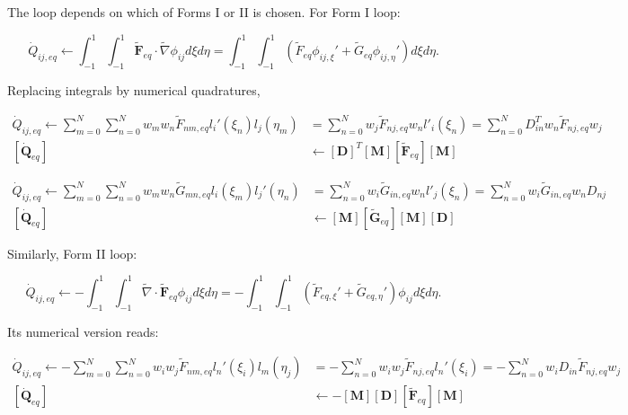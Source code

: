 \documentclass[10pt,a4paper]{article}
\begin{document}
The loop depends on which of Forms I or II is chosen. For Form I loop:

\begin{equation}
\dot{Q}_{ij,eq} \leftarrow \int_{-1}^1 \int_{-1}^1 \boldsymbol{\tilde{F}}_{eq}\cdot \tilde{\nabla} \phi_{ij} d\xi d\eta = \int_{-1}^1 \int_{-1}^1 (\tilde{F}_{eq}\phi_{ij,\xi}' + \tilde{G}_{eq}\phi_{ij,\eta}' )d\xi d\eta.
\end{equation}

Replacing integrals by numerical quadratures,

\begin{equation}
\begin{split}
\dot{Q}_{ij,eq} \leftarrow \sum_{m=0}^N \sum_{n=0}^N	 w_m w_n \tilde{F}_{nm,eq}l_i'(\xi_n)l_j(\eta_m) &= \sum_{n=0}^N w_j \tilde{F}_{nj,eq} w_n l'_i(\xi_n) =  \sum_{n=0}^N  D_{in}^T w_n\tilde{F}_{nj,eq} w_j \\
[\dot{\boldsymbol{Q}}_{eq}] &\leftarrow [\boldsymbol{D}]^T [\boldsymbol{M}] [\boldsymbol{\tilde{F}}_{eq}] [\boldsymbol{M}]
\end{split}
\end{equation}


\begin{equation}
\begin{split}
\dot{Q}_{ij,eq} \leftarrow \sum_{m=0}^N \sum_{n=0}^N	 w_m w_n \tilde{G}_{mn,eq}l_i(\xi_m)l_j'(\eta_n) &= \sum_{n=0}^N w_i \tilde{G}_{in,eq} w_n l'_j(\xi_n) =   \sum_{n=0}^N w_i \tilde{G}_{in,eq} w_n D_{nj} \\
[\dot{\boldsymbol{Q}}_{eq}]&\leftarrow [\boldsymbol{M}] [\boldsymbol{\tilde{G}}_{eq}] [\boldsymbol{M}][\boldsymbol{D}]
\end{split}
\end{equation}

Similarly, Form II loop:

\begin{equation}
\dot{Q}_{ij,eq} \leftarrow -\int_{-1}^1 \int_{-1}^1 \tilde{\nabla}\cdot \tilde{\boldsymbol{F}}_{eq} \phi_{ij} d\xi d\eta = -\int_{-1}^1 \int_{-1}^1 (\tilde{F}_{eq,\xi}' + \tilde{G}_{eq,\eta}')\phi_{ij}  d\xi d\eta.
\end{equation}

Its numerical version reads:

\begin{equation}
\begin{split}
\dot{Q}_{ij,eq} \leftarrow -\sum_{m=0}^N \sum_{n=0}^N	 w_i w_j \tilde{F}_{nm,eq}l_n'(\xi_i)l_m(\eta_j) &= -\sum_{n=0}^N	 w_i w_j \tilde{F}_{nj,eq}l_n'(\xi_i) =  -\sum_{n=0}^N w_i D_{in} \tilde{F}_{nj,eq} w_j  \\
[\dot{\boldsymbol{Q}}_{eq}] &\leftarrow -[\boldsymbol{M}] [\boldsymbol{D}] [\boldsymbol{\tilde{F}}_{eq}] [\boldsymbol{M}]
\end{split}
\end{equation}
\end{document}
